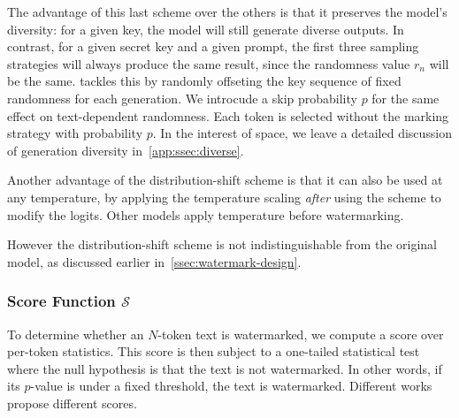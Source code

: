 The advantage of this last scheme over the others is that it preserves the model's diversity: 
for a given key, the model will still generate diverse outputs.
In contrast, for a given secret key and a given prompt, the first three sampling strategies 
will always produce the same result, since the randomness value $r_n$ will be the same.
\citet{kuditipudi_robust_2023} tackles this by randomly offseting the key sequence of 
fixed randomness for each generation. We introcude a skip probability $p$ for the 
same effect on text-dependent randomness. Each token is selected without the marking 
strategy with probability $p$. In the interest of space, we leave a detailed discussion 
of generation diversity in~\cref{app:ssec:diverse}.

Another advantage of the distribution-shift scheme is that it can also be used 
at any temperature, by applying the temperature scaling \emph{after} using the 
scheme to modify the logits. Other models apply temperature before watermarking.

However the distribution-shift scheme is not indistinguishable from the original model, 
as discussed earlier in~\cref{ssec:watermark-design}.

\subsubsection{Score Function $\mathcal{S}$}\label{ssec:score}



To determine whether an $N$-token text is watermarked, we compute a score over per-token statistics.
%
This score is then subject to a one-tailed statistical test where the null hypothesis is that the text is not watermarked.
%
In other words, if its $p$-value is under a fixed threshold, the text is watermarked.
%
Different works propose different scores.

